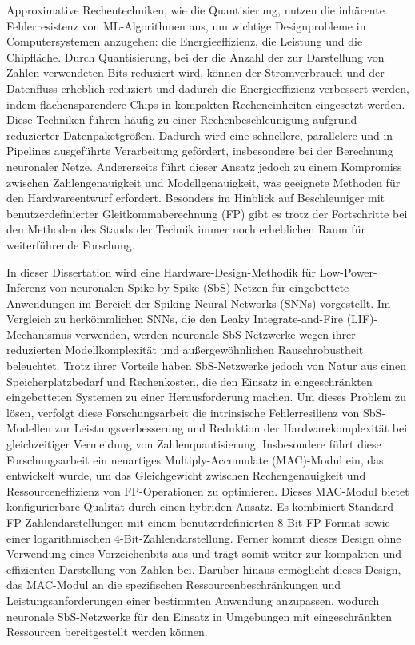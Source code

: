 Approximative Rechentechniken, wie die Quantisierung, nutzen die inh\"arente Fehlerresistenz von ML-Algorithmen aus, um wichtige Designprobleme in Computersystemen anzugehen: die Energieeffizienz, die Leistung und die Chipfl\"ache. Durch Quantisierung, bei der die Anzahl der zur Darstellung von Zahlen verwendeten Bits reduziert wird, k\"onnen der Stromverbrauch und der Datenfluss erheblich reduziert und dadurch die Energieeffizienz verbessert werden, indem fl\"achensparendere Chips in kompakten Recheneinheiten eingesetzt werden. Diese Techniken f\"uhren h\"aufig zu einer Rechenbeschleunigung aufgrund reduzierter Datenpaketgr\"o\ss{}en. Dadurch wird eine schnellere, parallelere und in Pipelines ausgef\"uhrte Verarbeitung gef\"ordert, insbesondere bei der Berechnung neuronaler Netze. Andererseits f\"uhrt dieser Ansatz jedoch zu einem Kompromiss zwischen Zahlengenauigkeit und Modellgenauigkeit, was geeignete Methoden f\"ur den Hardwareentwurf erfordert. Besonders im Hinblick auf Beschleuniger mit benutzerdefinierter Gleitkommaberechnung (FP) gibt es trotz der Fortschritte bei den Methoden des Stands der Technik immer noch erheblichen Raum f\"ur weiterf\"uhrende Forschung.

In dieser Dissertation wird eine Hardware-Design-Methodik f\"ur Low-Power-Inferenz von neuronalen Spike-by-Spike (SbS)-Netzen f\"ur eingebettete Anwendungen im Bereich der Spiking Neural Networks (SNNs) vorgestellt. Im Vergleich zu herk\"ommlichen SNNs, die den Leaky Integrate-and-Fire (LIF)-Mechanismus verwenden, werden neuronale SbS-Netzwerke wegen ihrer reduzierten Modellkomplexit\"at und au\ss{}ergew\"ohnlichen Rauschrobustheit beleuchtet. Trotz ihrer Vorteile haben SbS-Netzwerke jedoch von Natur aus einen Speicherplatzbedarf und Rechenkosten, die den Einsatz in eingeschr\"ankten eingebetteten Systemen zu einer Herausforderung machen. Um dieses Problem zu l\"osen, verfolgt diese Forschungsarbeit die intrinsische Fehlerresilienz von SbS-Modellen zur Leistungsverbesserung und Reduktion der Hardwarekomplexit\"at bei gleichzeitiger Vermeidung von Zahlenquantisierung. Insbesondere f\"uhrt diese Forschungsarbeit ein neuartiges Multiply-Accumulate (MAC)-Modul ein, das entwickelt wurde, um das Gleichgewicht zwischen Rechengenauigkeit und Ressourceneffizienz von FP-Operationen zu optimieren. Dieses MAC-Modul bietet konfigurierbare Qualit\"at durch einen hybriden Ansatz. Es kombiniert Standard-FP-Zahlendarstellungen mit einem benutzerdefinierten 8-Bit-FP-Format sowie einer logarithmischen 4-Bit-Zahlendarstellung. Ferner kommt dieses Design ohne Verwendung eines Vorzeichenbits aus und tr\"agt somit weiter zur kompakten und effizienten Darstellung von Zahlen bei. Dar\"uber hinaus erm\"oglicht dieses Design, das MAC-Modul an die spezifischen Ressourcenbeschr\"ankungen und Leistungsanforderungen einer bestimmten Anwendung anzupassen, wodurch neuronale SbS-Netzwerke f\"ur den Einsatz in Umgebungen mit eingeschr\"ankten Ressourcen bereitgestellt werden k\"onnen.

